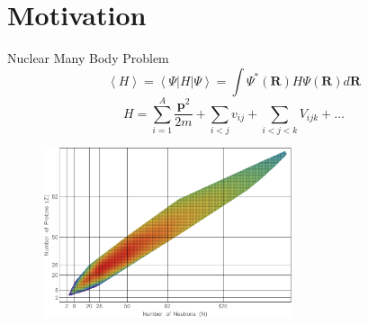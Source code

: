 \documentclass{beamer}
\newcommand{\ket}[1]{\left| #1 \right>}
\newcommand{\bra}[1]{\left< #1 \right|}
\begin{document}
\section{Motivation}
\begin{frame}{Nuclear Many Body Problem}
\vspace{-0.5cm}
\begin{equation*}
   \left<H\right> = \bra{\Psi}H\ket{\Psi} = \int\Psi^*(\bm{R})H\Psi(\bm{R}) d\bm{R}
\end{equation*}
\begin{equation*}
   H = \sum\limits_{i=1}^A \frac{\bm{p}^2}{2m} + \sum\limits_{i<j} v_{ij} + \sum\limits_{i<j<k} V_{ijk} + \ldots
\end{equation*}
\begin{figure}
   \includegraphics[width=0.65\textwidth]{../figures/tableofnuclides.pdf}
\end{figure}
\end{frame}
\end{document}
